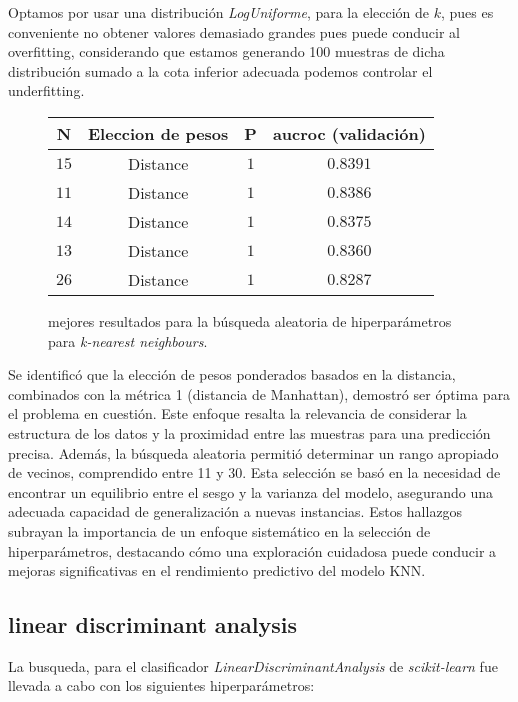 Optamos por usar una distribución \textit{LogUniforme}, para la elección de $k$, pues es conveniente no obtener valores demasiado grandes pues puede conducir al overfitting, considerando que estamos generando 100 muestras de dicha distribución sumado a la cota inferior adecuada podemos controlar el underfitting. 
\vspace{0.5em}
\begin{figure}[!htbp]
    \begin{center}
        \begin{tabular}{ |c|c|c|c| } 
         \hline
        N   & Eleccion de pesos & P  & aucroc (validación) \\
        \hline
        $15$             & Distance          &  $1$             & $0.8391$  \\ 
        $11$             & Distance          &  $1$             & $0.8386$  \\
        $14$             & Distance          &  $1$             & $0.8375$  \\ 
        $13$             & Distance          &  $1$             & $0.8360$  \\
        $26$             & Distance          &  $1$             & $0.8287$  \\ 
        \hline
        \end{tabular}
    \end{center}
    \caption{mejores resultados para la búsqueda aleatoria de hiperparámetros para \textit{k-nearest neighbours}.} \label{knn}
\end{figure}

Se identificó que la elección de pesos ponderados basados en la distancia, combinados con la métrica 1 (distancia de Manhattan), demostró ser óptima para el problema en cuestión. Este enfoque resalta la relevancia de considerar la estructura de los datos y la proximidad entre las muestras para una predicción precisa.
Además, la búsqueda aleatoria permitió determinar un rango apropiado de vecinos, comprendido entre 11 y 30. Esta selección se basó en la necesidad de encontrar un equilibrio entre el sesgo y la varianza del modelo, asegurando una adecuada capacidad de generalización a nuevas instancias.
Estos hallazgos subrayan la importancia de un enfoque sistemático en la selección de hiperparámetros, destacando cómo una exploración cuidadosa puede conducir a mejoras significativas en el rendimiento predictivo del modelo KNN.

\subsection{linear discriminant analysis}
La busqueda, para el clasificador \textit{LinearDiscriminantAnalysis} de \textit{scikit-learn} fue llevada a cabo con los siguientes hiperparámetros: 

